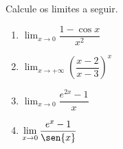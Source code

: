 \begin{frame}
  \begin{example}
    Calcule os limites a seguir.
  \end{example}
  \begin{enumerate}
    \item $\displaystyle\lim_{x\to 0}\dfrac{1-\cos{x}}{x^2}$
    \item $\displaystyle\lim_{x\to +\infty}{\left(\dfrac{x-2}{x-3}\right)}^x$
    \item $\displaystyle\lim_{x\to 0}\dfrac{e^{2x}-1}{x}$
    \item $\displaystyle\lim_{x\to 0}\dfrac{e^{x}-1}{\sen{x}}$
  \end{enumerate}
\end{frame}

